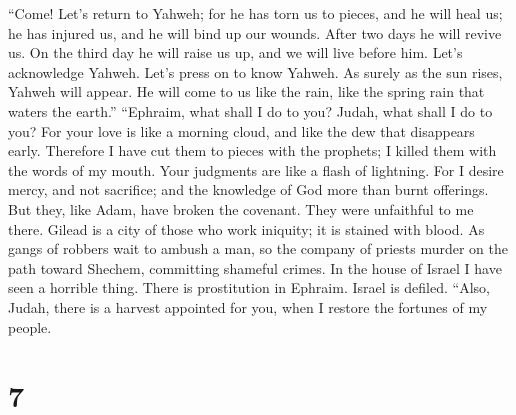  ``Come! Let's return to Yahweh; for he has torn us to
pieces, and he will heal us; he has injured us, and he will bind up our
wounds.  After two days he will revive us. On the third
day he will raise us up, and we will live before him. 
Let's acknowledge Yahweh. Let's press on to know Yahweh. As surely as
the sun rises, Yahweh will appear. He will come to us like the rain,
like the spring rain that waters the earth.''  ``Ephraim,
what shall I do to you? Judah, what shall I do to you? For your love is
like a morning cloud, and like the dew that disappears early.
 Therefore I have cut them to pieces with the prophets; I
killed them with the words of my mouth. Your judgments are like a flash
of lightning.  For I desire mercy, and not sacrifice; and
the knowledge of God more than burnt offerings.  But they,
like Adam, have broken the covenant. They were unfaithful to me there.
 Gilead is a city of those who work iniquity; it is
stained with blood.  As gangs of robbers wait to ambush a
man, so the company of priests murder on the path toward Shechem,
committing shameful crimes.  In the house of Israel I
have seen a horrible thing. There is prostitution in Ephraim. Israel is
defiled.  ``Also, Judah, there is a harvest appointed for
you, when I restore the fortunes of my people.

\hypertarget{section-6}{%
\section{7}\label{section-6}}

